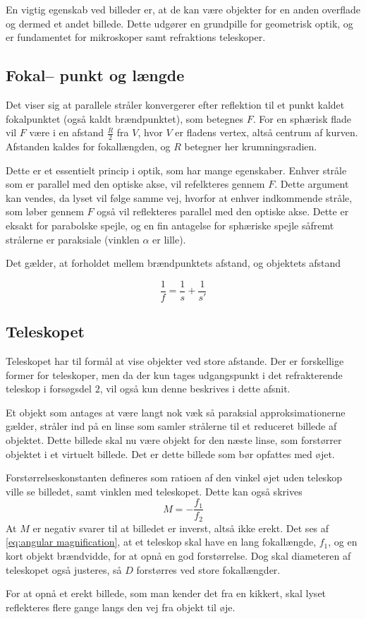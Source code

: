 En vigtig egenskab ved billeder er, at de kan være objekter for en anden overflade og dermed et andet billede. Dette udgører en grundpille for geometrisk optik, og er fundamentet for mikroskoper samt refraktions teleskoper. 


\subsection{Fokal-- punkt og længde}
Det viser sig at parallele stråler konvergerer efter reflektion til et punkt
kaldet fokalpunktet (også kaldt brændpunktet), som betegnes $F$. For en sphærisk flade vil $F$ være i en afstand $\frac{R}{2}$ fra $V$, hvor $V$ er fladens vertex, altså centrum af kurven. Afstanden kaldes for fokallængden, og $R$ betegner her krumningsradien.

Dette er et  essentielt princip i optik, som har mange egenskaber.
Enhver stråle som er parallel med den optiske akse, vil refelkteres gennem $F$. Dette argument kan vendes, da lyset vil følge samme vej, hvorfor at enhver indkommende stråle, som løber gennem $F$ også vil reflekteres parallel med den optiske akse. Dette er eksakt for parabolske spejle, og en fin antagelse for sphæriske spejle såfremt strålerne er paraksiale (vinklen $\alpha$ er lille).

Det gælder, at forholdet mellem brændpunktets afstand, og objektets afstand

\begin{equation}
    \frac{1}{f} = \frac{1}{s} + \frac{1}{s'}
    \label{eq:fokalvokal}
\end{equation}

\subsection{Teleskopet}
Teleskopet har til formål at vise objekter ved store afstande. Der er forskellige former for teleskoper, men da der kun tages udgangspunkt i det refrakterende teleskop i forsøgsdel $2$, vil også kun denne beskrives i dette afsnit.

Et objekt som antages at være langt nok væk så paraksial approksimationerne gælder, stråler ind på en linse som samler strålerne til et reduceret billede af objektet. Dette billede skal nu være objekt for den næste linse, som forstørrer objektet i et virtuelt billede. Det er dette billede som bør opfattes med øjet.

Forstørrelseskonstanten defineres som ratioen af den vinkel øjet uden teleskop ville se billedet, samt vinklen med teleskopet. Dette kan også skrives
\begin{equation}
    M = - \frac{f_1}{f_2}
    \label{eq:angular magnification}
\end{equation}
At $M$ er negativ svarer til at billedet er inverst, altså ikke erekt. Det ses af \cref{eq:angular magnification}, at et teleskop skal have en lang fokallængde, $f_1$, og en kort objekt brændvidde, for at opnå en god forstørrelse. Dog skal diameteren af teleskopet også justeres, så $D$ forstørres ved store fokallængder.

For at opnå et erekt billede, som man kender det fra en kikkert, skal lyset reflekteres flere gange langs den vej fra objekt til øje.



